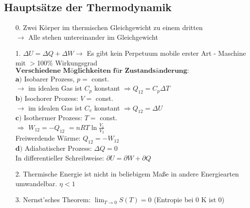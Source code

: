 \documentclass[fs, footer]{latex4ei}
\begin{document}
\begin{multicols*}{4}
\subsection{Hauptsätze der Thermodynamik}
\begin{itemize}
\item[0.] Zwei Körper im thermischen Gleichgewicht zu einem dritten\\ $\rightarrow$ Alle stehen untereinander im Gleichgewicht\\
\item[1.] $\Delta U = \Delta Q + \Delta W \rightarrow $ Es gibt kein Perpetuum mobile erster Art - Maschine mit $>$100\% Wirkungsgrad\\
$\textbf{Verschiedene Möglichkeiten für Zustandsänderung:}$\\
$\textbf{a)}$ Isobarer Prozess, $p =$ const.\\ $\rightarrow$ im idealen Gas ist $C_p$ konstant $\Rightarrow Q_{12} = C_p \Delta T$\\
$\textbf{b)}$ Isochorer Prozess: $V =$ const.\\ $\rightarrow$ im idealen Gas ist $C_v$ konstant $\Rightarrow Q_{12} = \Delta U$\\
$\textbf{c)}$ Isothermer Prozess: $T =$ const.\\ $\Rightarrow$ $W_{12} = -Q_{12}$ %
$ =n RT \ln\frac{V_1}{V_2}$
\\Freiwerdende Wärme: $Q_{12} = -W_{12}$\\
$\textbf{d)}$ Adiabatischer Prozess: $\Delta Q = 0$\\
In differentieller Schreibweise: $\partial U = \partial W + \partial Q $\\
\item[2.] Thermische Energie ist nicht in beliebigem Maße in andere Energiearten umwandelbar. $\eta < 1$
\item[3.] Nernst'sches Theorem: $\lim_{T \rightarrow 0} S(T) = 0$ (Entropie bei 0 K ist 0)\\
\end{itemize}



\end{multicols*}
\end{document}

